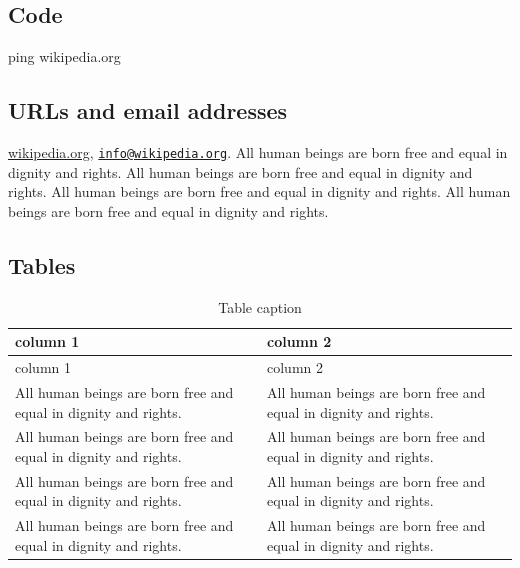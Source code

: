 \documentclass[
  english,
  american,
]{beamer}
\newenvironment{Shaded}{}{}
\newcommand{\FunctionTok}[1]{\textcolor[rgb]{0.02,0.16,0.49}{#1}}
\newcommand{\NormalTok}[1]{#1}
\begin{document}
\subsection{Code}\label{code}

\begin{Shaded}
\begin{Highlighting}[]
\FunctionTok{ping}\NormalTok{ wikipedia.org}
\end{Highlighting}
\end{Shaded}

\subsection{URLs and email addresses}\label{urls-and-email-addresses}

\href{https://www.wikipedia.org/}{wikipedia.org},
\href{mailto:info@wikipedia.org}{\nolinkurl{info@wikipedia.org}}. All
human beings are born free and equal in dignity and rights. All human
beings are born free and equal in dignity and rights. All human beings
are born free and equal in dignity and rights. All human beings are born
free and equal in dignity and rights.

\subsection{Tables}\label{tables}

\begin{longtable}[]{@{}
  >{\raggedright\arraybackslash}p{}
  >{\raggedright\arraybackslash}p{}@{}}
\caption{Table caption}\tabularnewline
\toprule\noalign{}
\begin{minipage}[b]{\linewidth}\raggedright
column 1
\end{minipage} & \begin{minipage}[b]{\linewidth}\raggedright
column 2
\end{minipage} \\
\midrule\noalign{}
\endfirsthead
\toprule\noalign{}
\begin{minipage}[b]{\linewidth}\raggedright
column 1
\end{minipage} & \begin{minipage}[b]{\linewidth}\raggedright
column 2
\end{minipage} \\
\midrule\noalign{}
\endhead
\bottomrule\noalign{}
\endlastfoot
All human beings are born free and equal in dignity and rights. & All
human beings are born free and equal in dignity and rights. \\
All human beings are born free and equal in dignity and rights. & All
human beings are born free and equal in dignity and rights. \\
All human beings are born free and equal in dignity and rights. & All
human beings are born free and equal in dignity and rights. \\
All human beings are born free and equal in dignity and rights. & All
human beings are born free and equal in dignity and rights. \\
\end{longtable}
\end{document}
